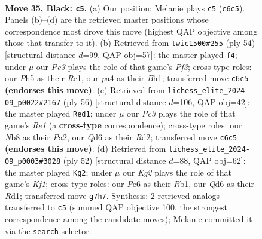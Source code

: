 \documentclass[11pt]{article}
\begin{document}
\clearpage

\begin{figure}[p]\centering
\begin{subfigure}{0.46\textwidth}\centering
\resizebox{\linewidth}{!}{%
\newchessgame
\chessboard[
  setfen={rnb4r/1p4k1/2pqp3/p4p1p/PnpP1P2/N4NP1/1P1QB1KP/4R2R b - - 3 35},
  showmover=false,
  pgfstyle=straightmove, color=movearrow, markmove={c6-c5}
]}
\caption{}
\end{subfigure}\hfill
\begin{subfigure}{0.46\textwidth}\centering
\resizebox{\linewidth}{!}{%
\newchessgame
\chessboard[
  setfen={1r2r1k1/ppq3p1/2n4p/P3pp2/2P5/1N1PQPPb/4P2P/1R2R1KB w - - 0 28},
  showmover=false,
  pgfstyle=straightmove, color=movearrow, markmove={f3-f4}
]}
\caption{}
\end{subfigure}
\\[4pt]
\begin{subfigure}{0.46\textwidth}\centering
\resizebox{\linewidth}{!}{%
\newchessgame
\chessboard[
  setfen={1r1r2k1/2pq1pp1/4n1p1/4P3/1b1pNB2/pP3Q1P/P2R1PP1/4R1K1 w - - 1 29},
  showmover=false,
  pgfstyle=straightmove, color=movearrow, markmove={e1-d1}
]}
\caption{}
\end{subfigure}\hfill
\begin{subfigure}{0.46\textwidth}\centering
\resizebox{\linewidth}{!}{%
\newchessgame
\chessboard[
  setfen={3r1r2/1pqn1pk1/p1p3p1/P3b2p/1P2N2Q/5BP1/4PP1P/1R1R1K2 w - - 6 27},
  showmover=false,
  pgfstyle=straightmove, color=movearrow, markmove={f1-g2}
]}
\caption{}
\end{subfigure}
\caption{\textbf{Move 35, Black: \texttt{c5}.} (a) Our position; Melanie plays \texttt{c5} (\texttt{c6c5}). Panels (b)--(d) are the retrieved master positions whose correspondence most drove this move (highest QAP objective among those that transfer to it). (b) Retrieved from \texttt{twic1500\#255} (ply 54) [structural distance $d$=99, QAP obj=57]: the master played \texttt{f4}; under $\mu$ our \emph{Pc3} plays the role of that game's \emph{Pf3}; cross-type roles: our \emph{P}h5 as their \emph{R}e1, our \emph{p}a4 as their \emph{B}h1; transferred move \texttt{c6c5} \textbf{(endorses this move)}. (c) Retrieved from \texttt{lichess\_elite\_2024-09\_p0022\#2167} (ply 56) [structural distance $d$=106, QAP obj=42]: the master played \texttt{Red1}; under $\mu$ our \emph{Pc3} plays the role of that game's \emph{Re1} (a \textbf{cross-type} correspondence); cross-type roles: our \emph{N}b8 as their \emph{P}a2, our \emph{Q}d6 as their \emph{R}d2; transferred move \texttt{c6c5} \textbf{(endorses this move)}. (d) Retrieved from \texttt{lichess\_elite\_2024-09\_p0003\#3028} (ply 52) [structural distance $d$=88, QAP obj=62]: the master played \texttt{Kg2}; under $\mu$ our \emph{Kg2} plays the role of that game's \emph{Kf1}; cross-type roles: our \emph{P}e6 as their \emph{R}b1, our \emph{Q}d6 as their \emph{R}d1; transferred move \texttt{g7h7}. Synthesis: 2 retrieved analogs transferred to \texttt{c5} (summed QAP objective 100, the strongest correspondence among the candidate moves); Melanie committed it via the \texttt{search} selector.}
\label{fig:thought-m69}
\end{figure}
\end{document}
